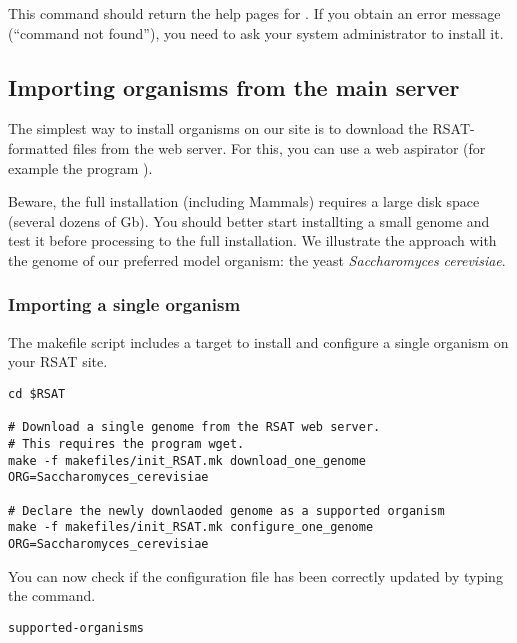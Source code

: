 This command should return the help pages for .  If you
obtain an error message (``command not found''), you need to ask your
system administrator to install it.

\subsection{Importing organisms from the \RSAT main server}

The simplest way to install organisms on our \RSAT site is to download
the RSAT-formatted files from the web server. For this, you can use a
web aspirator (for example the program ). 

Beware, the full installation (including Mammals) requires a large
disk space (several dozens of Gb). You should better start installting
a small genome and test it before processing to the full
installation. We illustrate the approach with the genome of our
preferred model organism: the yeast \textit{Saccharomyces cerevisiae}.

\subsubsection{Importing a single organism}

The makefile script  includes a target to
install and configure a single organism on your RSAT site. 

\begin{footnotesize}
\begin{verbatim}
cd $RSAT

# Download a single genome from the RSAT web server. 
# This requires the program wget.
make -f makefiles/init_RSAT.mk download_one_genome ORG=Saccharomyces_cerevisiae

# Declare the newly downlaoded genome as a supported organism
make -f makefiles/init_RSAT.mk configure_one_genome ORG=Saccharomyces_cerevisiae

\end{verbatim}
\end{footnotesize}

You can now check if the configuration file has been correctly updated
by typing the command.

\begin{footnotesize}
\begin{verbatim}
supported-organisms
\end{verbatim}
\end{footnotesize}


